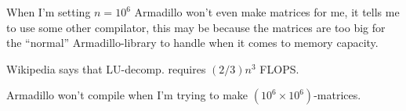 \documentclass[english, 11pt]{article}
\begin{document}
When I'm setting $n=10^6$ Armadillo won't even make matrices for me, it tells me to use some other compilator, this may be because the matrices are too big for the ``normal'' Armadillo-library to handle when it comes to memory capacity.




Wikipedia says that LU-decomp. requires $(2/3)n^3$ FLOPS.

Armadillo won't compile when I'm trying to make $(10^6 \times 10^6)$-matrices.
\end{document}
